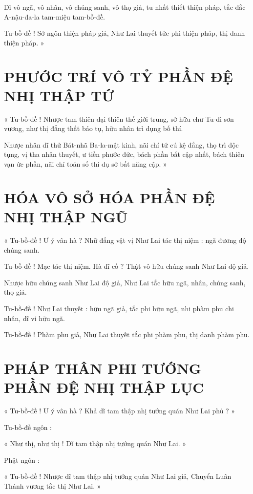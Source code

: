 	Dĩ vô ngã, vô nhân, vô chúng sanh, vô thọ giả, tu nhất thiết thiện pháp, tắc đắc A-nậu-đa-la tam-miệu tam-bồ-đề. 
	
	Tu-bồ-đề ! Sở ngôn thiện pháp giả, Như Lai thuyết tức phi thiện pháp, thị danh thiện pháp. »
	
	\section*{PHƯỚC TRÍ VÔ TỶ PHẦN ĐỆ NHỊ THẬP TỨ}
	
	« Tu-bồ-đề ! Nhược tam thiên đại thiên thế giới trung, sở hữu chư Tu-di sơn vương, như thị đẳng thất bảo tụ, hữu nhân trì dụng bố thí. 
	
	Nhược nhân dĩ thử Bát-nhã Ba-la-mật kinh, nãi chí tứ cú kệ đẳng, thọ trì độc tụng, vị tha nhân thuyết, ư tiền phước đức, bách phần bất cập nhất, bách thiên vạn ức phần, nãi chí toán số thí dụ sở bất năng cập. »
	
	\section*{HÓA VÔ SỞ HÓA PHẦN ĐỆ NHỊ THẬP NGŨ}
	
	« Tu-bồ-đề ! Ư ý vân hà ? Nhữ đẳng vật vị Như Lai tác thị niệm : ngã đương độ chúng sanh. 
	
	Tu-bồ-đề ! Mạc tác thị niệm. Hà dĩ cố ? Thật vô hữu chúng sanh Như Lai độ giả. 
	
	Nhược hữu chúng sanh Như Lai độ giả, Như Lai tắc hữu ngã, nhân, chúng sanh, thọ giả. 
	
	Tu-bồ-đề ! Như Lai thuyết : hữu ngã giả, tắc phi hữu ngã, nhi phàm phu chi nhân, dĩ vi hữu ngã. 
	
	Tu-bồ-đề ! Phàm phu giả, Như Lai thuyết tắc phi phàm phu, thị danh phàm phu.
	
	\section*{PHÁP THÂN PHI TƯỚNG PHẦN ĐỆ NHỊ THẬP LỤC}
	
	« Tu-bồ-đề ! Ư ý vân hà ? Khả dĩ tam thập nhị tướng quán Như Lai phủ ? »
	
	Tu-bồ-đề ngôn :
	
	« Như thị, như thị ! Dĩ tam thập nhị tướng quán Như Lai. »
	
	Phật ngôn :
	
	« Tu-bồ-đề ! Nhược dĩ tam thập nhị tướng quán Như Lai giả, Chuyển Luân Thánh vương tắc thị Như Lai. »
	
